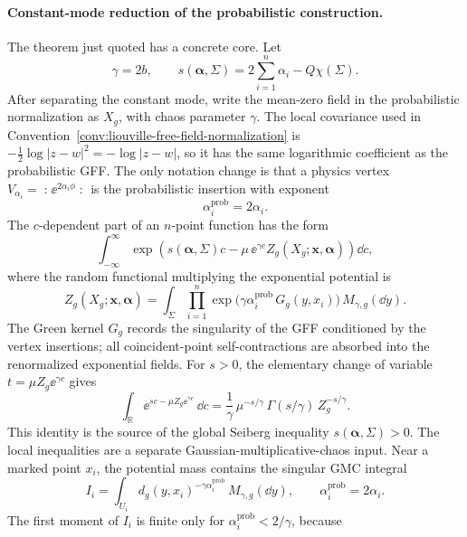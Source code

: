 \paragraph{Constant-mode reduction of the probabilistic construction.}
The theorem just quoted has a concrete core.  Let
\[
  \gamma=2b,\qquad
  s(\boldsymbol\alpha,\Sigma)
  =
  2\sum_{i=1}^n\alpha_i-Q\chi(\Sigma).
\]
After separating the constant mode, write the mean-zero field in the
probabilistic normalization as \(X_g\), with chaos parameter \(\gamma\).  The
local covariance used in
Convention~\ref{conv:liouville-free-field-normalization} is
\(-\frac12\log |z-w|^2=-\log |z-w|\), so it has the same logarithmic
coefficient as the probabilistic GFF.  The only notation change is that a
physics vertex \(V_{\alpha_i}=\mathopen{:}\ee^{2\alpha_i\phi}\mathclose{:}\)
is the probabilistic insertion with exponent
\[
  \alpha_i^{\mathrm{prob}}=2\alpha_i .
\]
The \(c\)-dependent part of an \(n\)-point function has the form
\[
  \int_{-\infty}^{\infty}
  \exp\!\left(
    s(\boldsymbol\alpha,\Sigma)c
    -\mu\,\ee^{\gamma c}
       Z_g(X_g;\boldsymbol x,\boldsymbol\alpha)
  \right)\dd c,
\]
where the random functional multiplying the exponential potential is
\begin{equation}
  Z_g(X_g;\boldsymbol x,\boldsymbol\alpha)
  =
  \int_\Sigma
  \prod_{i=1}^n
    \exp\!\bigl(\gamma \alpha_i^{\mathrm{prob}}\,G_g(y,x_i)\bigr)\,
  M_{\gamma,g}(\dd y).
  \label{eq:liouville-gmc-insertion-functional}
\end{equation}
The Green kernel \(G_g\) records the singularity of the GFF conditioned by
the vertex insertions; all coincident-point self-contractions are absorbed
into the renormalized exponential fields.  For \(s>0\), the elementary
change of variable \(t=\mu Z_g\ee^{\gamma c}\) gives
\begin{equation}
  \int_{\mathbb R}
  \ee^{s c-\mu Z_g\ee^{\gamma c}}\,\dd c
  =
  \frac1\gamma\,
  \mu^{-s/\gamma}\,
  \Gamma(s/\gamma)\,
  Z_g^{-s/\gamma}.
  \label{eq:liouville-zero-mode-gamma-integral}
\end{equation}
This identity is the source of the global Seiberg inequality
\(s(\boldsymbol\alpha,\Sigma)>0\).  The local inequalities are a separate
Gaussian-multiplicative-chaos input.  Near a marked point \(x_i\), the
potential mass contains the singular GMC integral
\[
  I_i
  =
  \int_{U_i}
  d_g(y,x_i)^{-\gamma\alpha_i^{\mathrm{prob}}}\,
  M_{\gamma,g}(\dd y),
  \qquad
  \alpha_i^{\mathrm{prob}}=2\alpha_i .
\]
The first moment of \(I_i\) is finite only for
\(\alpha_i^{\mathrm{prob}}<2/\gamma\), because

